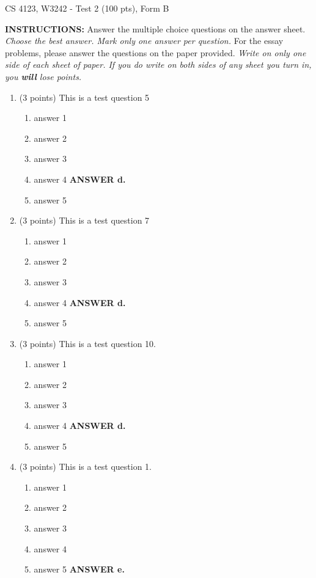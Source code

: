 \documentclass{article}
\newcommand{\ans}[1]{ \ifnum\showans=1 {\bf ANSWER #1.} \fi }
\begin{document}
{ \Large
\begin{center}
CS 4123, W3242 - Test 2 (100 pts), Form B
\end{center}
}

\vspace{.1in}

\noindent
{\Large\bf INSTRUCTIONS:} Answer the multiple choice questions on the
answer sheet.  {\em Choose the best answer.  Mark only one answer per
question.}  For the essay problems, please answer the questions on the
paper provided.  {\em Write on only one side of each sheet of paper.
If you do write on both sides of any sheet you turn in, you {\bf will}
lose points.}

\vspace{.1in}

\begin{enumerate}

\item (3 points) This is a test question 5
  \begin{enumerate}
  \item answer 1
  \item answer 2
  \item answer 3
  \item answer 4  \ans{d}
  \item answer 5
  \end{enumerate}

\item (3 points) This is a test question 7
  \begin{enumerate}
  \item answer 1
  \item answer 2
  \item answer 3
  \item answer 4  \ans{d}
  \item answer 5
  \end{enumerate}

\item (3 points) This is a test question 10.
  \begin{enumerate}
  \item answer 1
  \item answer 2
  \item answer 3
  \item answer 4  \ans{d}
  \item answer 5
  \end{enumerate}

\item (3 points) This is a test question 1.
  \begin{enumerate}
  \item answer 1
  \item answer 2
  \item answer 3
  \item answer 4
  \item answer 5  \ans{e}
  \end{enumerate}


\end{enumerate}
\end{document}
